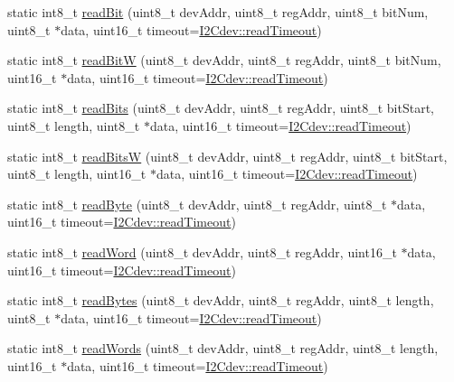 \begin{DoxyCompactItemize}
\item 
static int8\+\_\+t \hyperlink{classI2Cdev_abe6d8ea07027d362419de86188981559}{read\+Bit} (uint8\+\_\+t dev\+Addr, uint8\+\_\+t reg\+Addr, uint8\+\_\+t bit\+Num, uint8\+\_\+t $\ast$data, uint16\+\_\+t timeout=\hyperlink{classI2Cdev_ae2125796e0948127fc15031650111e82}{I2\+Cdev\+::read\+Timeout})
\item 
static int8\+\_\+t \hyperlink{classI2Cdev_aaaa3b9ef9500a7d69ccc3d0ccaae33c4}{read\+BitW} (uint8\+\_\+t dev\+Addr, uint8\+\_\+t reg\+Addr, uint8\+\_\+t bit\+Num, uint16\+\_\+t $\ast$data, uint16\+\_\+t timeout=\hyperlink{classI2Cdev_ae2125796e0948127fc15031650111e82}{I2\+Cdev\+::read\+Timeout})
\item 
static int8\+\_\+t \hyperlink{classI2Cdev_a8e5e9742072bb80db06ccd46f52e2b6d}{read\+Bits} (uint8\+\_\+t dev\+Addr, uint8\+\_\+t reg\+Addr, uint8\+\_\+t bit\+Start, uint8\+\_\+t length, uint8\+\_\+t $\ast$data, uint16\+\_\+t timeout=\hyperlink{classI2Cdev_ae2125796e0948127fc15031650111e82}{I2\+Cdev\+::read\+Timeout})
\item 
static int8\+\_\+t \hyperlink{classI2Cdev_a1f417ba3e5ce99832e07c31522c97f87}{read\+BitsW} (uint8\+\_\+t dev\+Addr, uint8\+\_\+t reg\+Addr, uint8\+\_\+t bit\+Start, uint8\+\_\+t length, uint16\+\_\+t $\ast$data, uint16\+\_\+t timeout=\hyperlink{classI2Cdev_ae2125796e0948127fc15031650111e82}{I2\+Cdev\+::read\+Timeout})
\item 
static int8\+\_\+t \hyperlink{classI2Cdev_ad3fb41ce124a29f93749d99611c75c33}{read\+Byte} (uint8\+\_\+t dev\+Addr, uint8\+\_\+t reg\+Addr, uint8\+\_\+t $\ast$data, uint16\+\_\+t timeout=\hyperlink{classI2Cdev_ae2125796e0948127fc15031650111e82}{I2\+Cdev\+::read\+Timeout})
\item 
static int8\+\_\+t \hyperlink{classI2Cdev_a545cd48b1e806e7e467b542c9e38e8c8}{read\+Word} (uint8\+\_\+t dev\+Addr, uint8\+\_\+t reg\+Addr, uint16\+\_\+t $\ast$data, uint16\+\_\+t timeout=\hyperlink{classI2Cdev_ae2125796e0948127fc15031650111e82}{I2\+Cdev\+::read\+Timeout})
\item 
static int8\+\_\+t \hyperlink{classI2Cdev_aca9c503da5cffd6ac6f8eff9b195c5f4}{read\+Bytes} (uint8\+\_\+t dev\+Addr, uint8\+\_\+t reg\+Addr, uint8\+\_\+t length, uint8\+\_\+t $\ast$data, uint16\+\_\+t timeout=\hyperlink{classI2Cdev_ae2125796e0948127fc15031650111e82}{I2\+Cdev\+::read\+Timeout})
\item 
static int8\+\_\+t \hyperlink{classI2Cdev_a1b3d895dc6a00cbb5fb3b0441b2e35de}{read\+Words} (uint8\+\_\+t dev\+Addr, uint8\+\_\+t reg\+Addr, uint8\+\_\+t length, uint16\+\_\+t $\ast$data, uint16\+\_\+t timeout=\hyperlink{classI2Cdev_ae2125796e0948127fc15031650111e82}{I2\+Cdev\+::read\+Timeout})

\end{DoxyCompactItemize}
